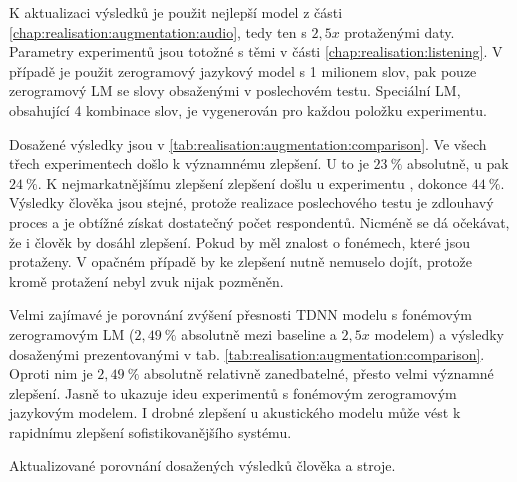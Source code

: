 K aktualizaci výsledků je použit nejlepší model z části \ref{chap:realisation:augmentation:audio}, tedy ten s $2,5x$ protaženými daty. Parametry experimentů jsou totožné s těmi v části \ref{chap:realisation:listening}. V případě  je použit zerogramový jazykový model s 1 milionem slov,  pak pouze zerogramový LM se slovy obsaženými v poslechovém testu. Speciální LM, obsahující 4 kombinace slov, je vygenerován pro každou položku  experimentu.

Dosažené výsledky jsou v \ref{tab:realisation:augmentation:comparison}. Ve všech třech experimentech došlo k významnému zlepšení. U  to je $23\ \%$ absolutně, u  pak $24\ \%$. K nejmarkatnějšímu zlepšení zlepšení došlu u experimentu , dokonce $44\ \%$. Výsledky člověka jsou stejné, protože realizace poslechového testu je zdlouhavý proces a je obtížné získat dostatečný počet respondentů. Nicméně se dá očekávat, že i člověk by dosáhl zlepšení. Pokud by měl znalost o fonémech, které jsou protaženy. V opačném případě by ke zlepšení nutně nemuselo dojít, protože kromě protažení nebyl zvuk nijak pozměněn.

Velmi zajímavé je porovnání zvýšení přesnosti TDNN modelu s fonémovým zerogramovým LM ($2,49\ \%$ absolutně mezi baseline a $2,5x$ modelem) a výsledky dosaženými prezentovanými v tab. \ref{tab:realisation:augmentation:comparison}. Oproti nim je $2,49\ \%$ absolutně relativně zanedbatelné, přesto velmi významné zlepšení. Jasně to ukazuje ideu experimentů s fonémovým zerogramovým jazykovým modelem. I drobné zlepšení u akustického modelu může vést k rapidnímu zlepšení sofistikovanějšího systému.

\begin{table}[htpb]
  \centering
  \def\arraystretch{1.5}
  \caption{Aktualizované porovnání dosažených výsledků člověka a stroje.}
  \label{tab:realisation:augmentation:comparison}
\end{table}

